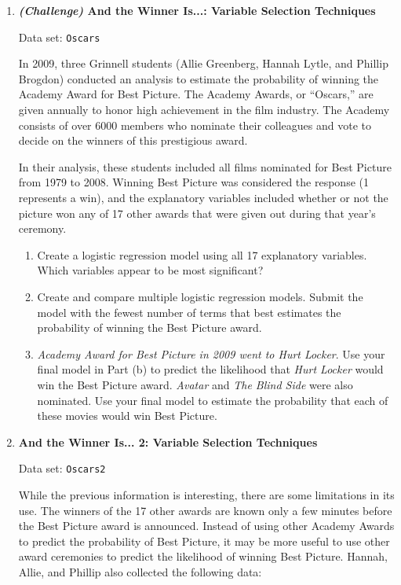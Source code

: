 \documentclass[
]{book}
\begin{document}
\begin{enumerate}
  \item \textbf{\textit{(Challenge)} And the Winner Is...: Variable Selection Techniques}

Data set: \texttt{Oscars}

In 2009, three Grinnell students (Allie Greenberg, Hannah Lytle, and Phillip Brogdon) conducted an analysis to estimate the probability of winning the Academy Award for Best Picture. The Academy Awards, or “Oscars,” are given annually to honor high achievement in the film industry. The Academy consists of over 6000 members who nominate their colleagues and vote to decide on the winners of this prestigious award.

In their analysis, these students included all films nominated for Best Picture from 1979 to 2008. Winning Best Picture was considered the response (1 represents a win), and the explanatory variables included whether or not the picture won any of 17 other awards that were given out during that year’s ceremony.

  \begin{enumerate}
    \item Create a logistic regression model using all 17 explanatory variables. Which variables appear to be most significant?
    \item Create and compare multiple logistic regression models. Submit the model with the fewest number of terms that best estimates the probability of winning the Best Picture award.
    \item \textit{Academy Award for Best Picture in 2009 went to \textit{Hurt Locker}}. Use your final model in Part (b) to predict the likelihood that \textit{Hurt Locker} would win the Best Picture award. \textit{Avatar} and \textit{The Blind Side} were also nominated. Use your final model to estimate the probability that each of these movies would win Best Picture.
  \end{enumerate}

  \item \textbf{And the Winner Is... 2: Variable Selection Techniques}

Data set: \texttt{Oscars2}

While the previous information is interesting, there are some limitations in its use. The winners of the 17 other awards are known only a few minutes before the Best Picture award is announced. Instead of using other Academy Awards to predict the probability of Best Picture, it may be more useful to use other award ceremonies to predict the likelihood of winning Best Picture. Hannah, Allie, and Phillip also collected the following data:


\end{enumerate}
\end{document}
